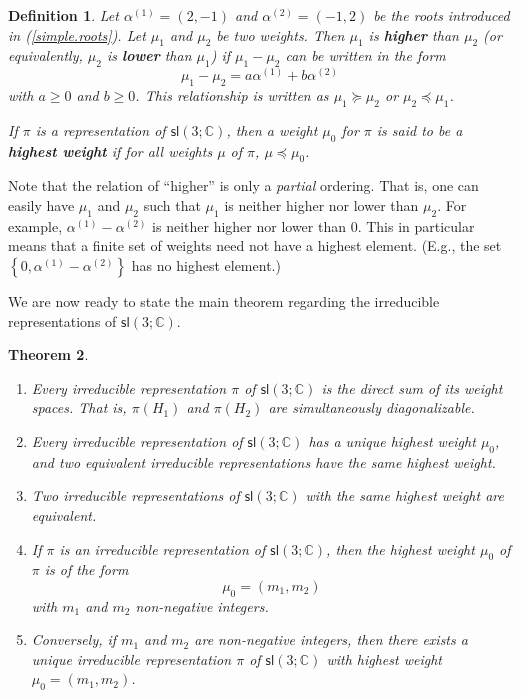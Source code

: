 \documentclass{amsbook}
\theoremstyle{plain}
\newtheorem{theorem}{Theorem}
\newtheorem{definition}[theorem]{Definition}
\numberwithin{equation}{chapter}
\numberwithin{theorem}{chapter}
\begin{document}
\begin{definition}
Let $\alpha^{(1)}=(2,-1)$ and $\alpha^{(2)}=(-1,2)$ be the roots introduced in
(\ref{simple.roots}). Let $\mu_{1}$ and $\mu_{2}$ be two weights. Then
$\mu_{1}$ is \textbf{higher} than $\mu_{2}$ (or equivalently, $\mu_{2}$ is
\textbf{lower} than $\mu_{1}$) if $\mu_{1}-\mu_{2}$ can be written in the
form
\[
\mu_{1}-\mu_{2}=a\alpha^{(1)}+b\alpha^{(2)}%
\]
with $a\geq0$ and $b\geq0$. This relationship is written as $\mu_{1}\succeq
\mu_{2}$ or $\mu_{2}\preceq\mu_{1}$.

If $\pi$ is a representation of $\mathsf{sl}\left(  3;\mathbb{C}\right)  $,
then a weight $\mu_{0}$ for $\pi$ is said to be a \textbf{highest weight} if
for all weights $\mu$ of $\pi$, $\mu\preceq\mu_{0}$.
\end{definition}

Note that the relation of ``higher'' is only a \textit{partial} ordering. That
is, one can easily have $\mu_{1}$ and $\mu_{2}$ such that $\mu_{1}$ is neither
higher nor lower than $\mu_{2}$. For example, $\alpha^{(1)}-\alpha^{(2)}$ is
neither higher nor lower than $0$. This in particular means that a finite set
of weights need not have a highest element. (E.g., the set $\left\{
0,\alpha^{(1)}-\alpha^{(2)}\right\}  $ has no highest element.)

We are now ready to state the main theorem regarding the irreducible
representations of $\mathsf{sl}\left(  3;\mathbb{C}\right)  $.

\begin{theorem}
\begin{enumerate}
\item \label{classify.sl3}Every irreducible representation $\pi$ of
$\mathsf{sl}\left(  3;\mathbb{C}\right)  $ is the direct sum of its weight
spaces. That is, $\pi(H_{1})$ and $\pi(H_{2})$ are simultaneously diagonalizable.

\item  Every irreducible representation of $\mathsf{sl}\left(  3;\mathbb{C}%
\right)  $ has a unique highest weight $\mu_{0}$, and two equivalent
irreducible representations have the same highest weight.

\item  Two irreducible representations of $\mathsf{sl}\left(  3;\mathbb{C}%
\right)  $ with the same highest weight are equivalent.

\item  If $\pi$ is an irreducible representation of $\mathsf{sl}\left(
3;\mathbb{C}\right)  $, then the highest weight $\mu_{0}$ of $\pi$ is of the
form
\[
\mu_{0}=(m_{1},m_{2})
\]
with $m_{1}$ and $m_{2}$ non-negative integers.

\item  Conversely, if $m_{1}$ and $m_{2}$ are non-negative integers, then
there exists a unique irreducible representation $\pi$ of $\mathsf{sl}\left(
3;\mathbb{C}\right)  $ with highest weight $\mu_{0}=(m_{1},m_{2})$.
\end{enumerate}
\end{theorem}
\end{document}
